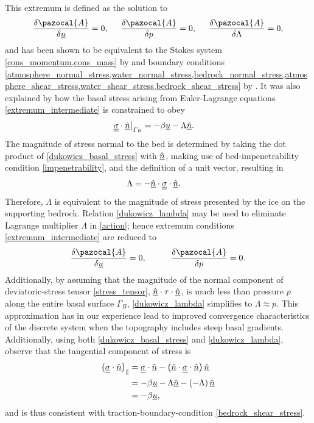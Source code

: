 This extremum is defined as the solution to 
\begin{align}
  \label{extremum_intermediate}
  \frac{\delta \pazocal{A}}{\delta \rankone{u}} = 0, \hspace{5mm} \frac{\delta \pazocal{A}}{\delta p} = 0, \hspace{5mm} \frac{\delta \pazocal{A}}{\delta \Lambda} = 0,
\end{align}
and has been shown to be equivalent to the Stokes system \cref{cons_momentum,cons_mass} by \citet{dukowicz_2010} and boundary conditions \cref{atmosphere_normal_stress,water_normal_stress,bedrock_normal_stress,atmosphere_shear_stress,water_shear_stress,bedrock_shear_stress} by \citet{dukowicz_2011}.
It was also explained by \citet{dukowicz_2011} how the basal stress arising from Euler-Lagrange equations \cref{extremum_intermediate} is constrained to obey
\begin{align}
  \label{dukowicz_basal_stress}
  \underline{\underline{\sigma}} \cdot \underline{\hat{n}} \big|_{\varGamma_B} &= - \beta \underline{u} - \Lambda \underline{\hat{n}}.
\end{align}
The magnitude of stress normal to the bed is determined by taking the dot product of \cref{dukowicz_basal_stress} with $\underline{\hat{n}}$, making use of bed-impenetrability condition \cref{impenetrability}, and the definition of a unit vector, resulting in
\begin{align}
  \label{dukowicz_lambda}
  \Lambda &= - \underline{\hat{n}} \cdot \underline{\underline{\sigma}} \cdot \underline{\hat{n}}.
\end{align}
Therefore, $\Lambda$ is equivalent to the magnitude of stress presented by the ice on the supporting bedrock.  Relation \cref{dukowicz_lambda} may be used to eliminate Lagrange multiplier $\Lambda$ in \cref{action}; hence extremum conditions \cref{extremum_intermediate} are reduced to
\begin{align}
  \label{extremum}
  \frac{\delta \pazocal{A}}{\delta \rankone{u}} = 0, \hspace{10mm} \frac{\delta \pazocal{A}}{\delta p} = 0.
\end{align}
Additionally, by assuming that the magnitude of the normal component of deviatoric-stress tensor \cref{stress_tensor}, $\underline{\hat{n}} \cdot \tau \cdot \underline{\hat{n}}$, is much less than pressure $p$ along the entire basal surface $\Gamma_B$, \cref{dukowicz_lambda} simplifies to $\Lambda \approx p$.  This approximation has in our experience lead to improved convergence characteristics of the discrete system when the topography includes steep basal gradients.  Additionally, using both \cref{dukowicz_basal_stress} and \cref{dukowicz_lambda}, observe that the tangential component of stress is
\begin{align}
  \left( \underline{\underline{\sigma}} \cdot \underline{\hat{n}} \right)_{\Vert} &= \underline{\underline{\sigma}} \cdot \underline{\hat{n}} - \left( \underline{\hat{n}} \cdot \underline{\underline{\sigma}} \cdot \underline{\hat{n}}\right) \underline{\hat{n}} \notag \\
  &= - \beta \underline{u} - \Lambda \underline{\hat{n}} - \left( -\Lambda \right) \underline{\hat{n}} \notag \\
  &= - \beta \underline{u},
\end{align}
and is thus consistent with traction-boundary-condition \cref{bedrock_shear_stress}.

